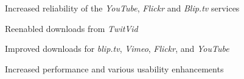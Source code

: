 \begin{changelog}
\item Increased reliability of the \emph{YouTube}, \emph{Flickr} and \emph{Blip.tv} services
\item Reenabled downloads from \emph{TwitVid}
\end{changelog}

\begin{changelog}
\item Improved downloads for \emph{blip.tv}, \emph{Vimeo}, \emph{Flickr}, and \emph{YouTube}
\end{changelog}

\begin{changelog}
\item Increased performance and various usability enhancements
\end{changelog}
